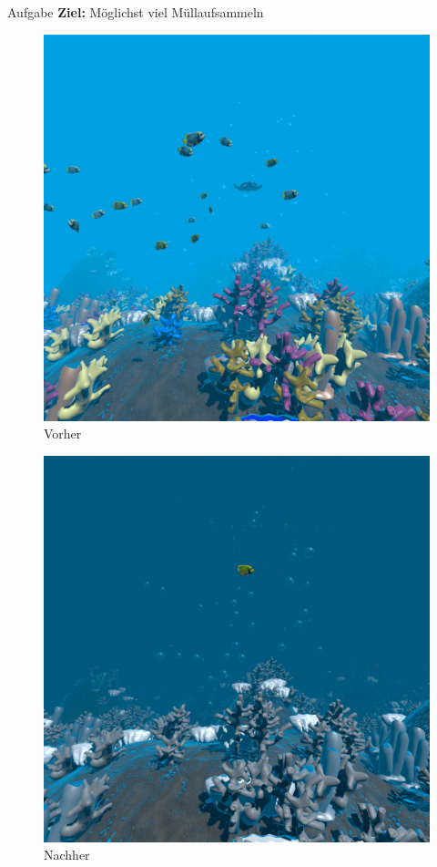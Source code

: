 \documentclass{beamer}
\begin{document}
\begin{frame}{Aufgabe}
\textbf{Ziel:} Möglichst viel Müllaufsammeln\\
\begin{minipage}[c]{0.49\textwidth}
\begin{figure}
\centering
\includegraphics[width=\textwidth, keepaspectratio]{img/vorher}
\caption{Vorher}
\end{figure}
\end{minipage}
\hfill
\begin{minipage}[c]{0.49\textwidth}
\begin{figure}
\centering
\includegraphics[width=\textwidth, keepaspectratio]{img/nachher}
\caption{Nachher}
\end{figure}
\end{minipage}
\end{frame}
\end{document}
